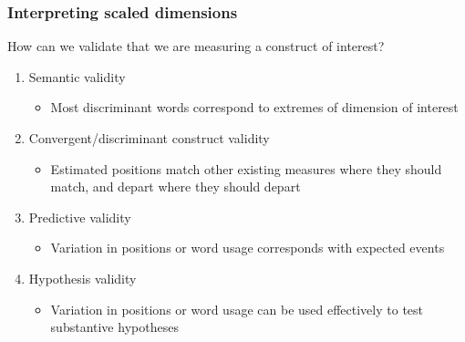 \documentclass{beamer}
\begin{document}
\begin{frame}
	\frametitle{Interpreting scaled dimensions}
	
	How can we validate that we are measuring a construct of interest?
	\begin{enumerate}[<+->]
		\item Semantic validity
		\begin{itemize}
			\item Most discriminant words correspond to extremes of dimension of interest
		\end{itemize}
		\item Convergent/discriminant construct validity
		\begin{itemize}
			\item Estimated positions match other existing measures where they should match, and depart where they should depart
		\end{itemize}
		\item Predictive validity
		\begin{itemize}
			\item Variation in positions or word usage corresponds with expected events
		\end{itemize}
		\item Hypothesis validity
		\begin{itemize}
			\item Variation in positions or word usage can be used effectively to test substantive hypotheses
		\end{itemize}
	\end{enumerate}
	
\end{frame}
\end{document}
